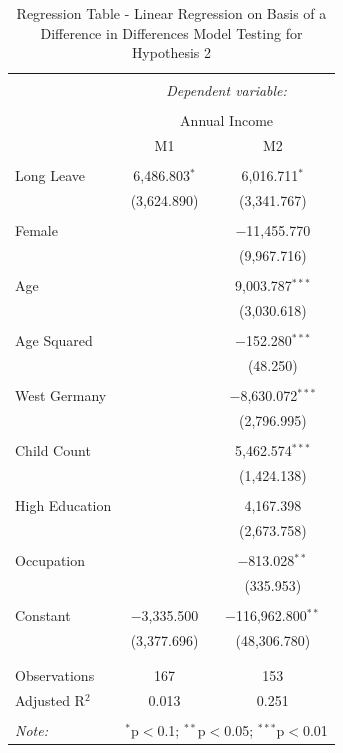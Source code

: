 \documentclass[
  11pt,
]{article}
\begin{document}
\begin{table}[!htbp] \centering 
  \caption{Regression Table - Linear Regression on Basis of a Difference in Differences Model Testing for Hypothesis 2} 
  \label{tab3} 
\footnotesize 
\begin{tabular}{@{\extracolsep{-5pt}}lcc} 
\\[-1.8ex]\hline 
\hline \\[-1.8ex] 
 & \multicolumn{2}{c}{\textit{Dependent variable:}} \\ 
\cline{2-3} 
\\[-1.8ex] & \multicolumn{2}{c}{Annual Income} \\ 
 & M1 & M2 \\ 
\hline \\[-1.8ex] 
 Long Leave & 6,486.803$^{*}$ & 6,016.711$^{*}$ \\ 
  & (3,624.890) & (3,341.767) \\ 
  & & \\ 
 Female &  & $-$11,455.770 \\ 
  &  & (9,967.716) \\ 
  & & \\ 
 Age &  & 9,003.787$^{***}$ \\ 
  &  & (3,030.618) \\ 
  & & \\ 
 Age Squared &  & $-$152.280$^{***}$ \\ 
  &  & (48.250) \\ 
  & & \\ 
 West Germany &  & $-$8,630.072$^{***}$ \\ 
  &  & (2,796.995) \\ 
  & & \\ 
 Child Count &  & 5,462.574$^{***}$ \\ 
  &  & (1,424.138) \\ 
  & & \\ 
 High Education &  & 4,167.398 \\ 
  &  & (2,673.758) \\ 
  & & \\ 
 Occupation &  & $-$813.028$^{**}$ \\ 
  &  & (335.953) \\ 
  & & \\ 
 Constant & $-$3,335.500 & $-$116,962.800$^{**}$ \\ 
  & (3,377.696) & (48,306.780) \\ 
  & & \\ 
\hline \\[-1.8ex] 
Observations & 167 & 153 \\ 
Adjusted R$^{2}$ & 0.013 & 0.251 \\ 
\hline 
\hline \\[-1.8ex] 
\textit{Note:}  & \multicolumn{2}{r}{$^{*}$p$<$0.1; $^{**}$p$<$0.05; $^{***}$p$<$0.01} \\ 
\end{tabular} 
\end{table}
\end{document}
